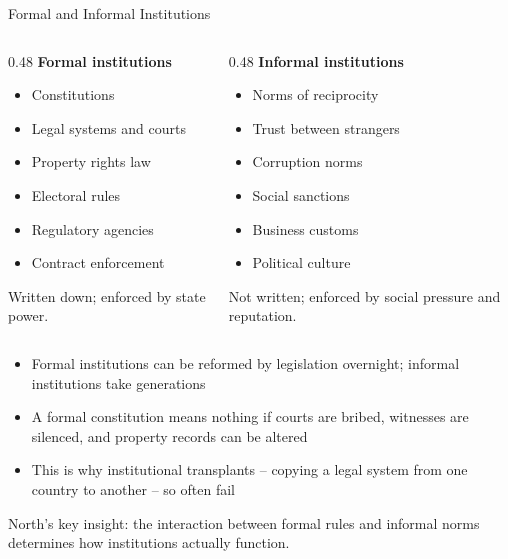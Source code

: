 \documentclass[10pt]{beamer}
\begin{document}
\begin{frame}[allowframebreaks]{Formal and Informal Institutions}

\begin{columns}[T]
\begin{column}{0.48\textwidth}
\textbf{\color{myTeal} Formal institutions}\\[6pt]
\begin{itemize}
\item Constitutions
\item Legal systems and courts
\item Property rights law
\item Electoral rules
\item Regulatory agencies
\item Contract enforcement
\end{itemize}
\vspace{4pt}
\footnotesize Written down; enforced by state power.
\end{column}
\begin{column}{0.48\textwidth}
\textbf{\color{myOrange} Informal institutions}\\[6pt]
\begin{itemize}
\item Norms of reciprocity
\item Trust between strangers
\item Corruption norms
\item Social sanctions
\item Business customs
\item Political culture
\end{itemize}
\vspace{4pt}
\footnotesize Not written; enforced by social pressure and reputation.
\end{column}
\end{columns}


\begin{itemize}
\item Formal institutions can be reformed by legislation overnight; informal institutions take generations
\item A formal constitution means nothing if courts are bribed, witnesses are silenced, and property records can be altered
\item This is why institutional transplants -- copying a legal system from one country to another -- so often fail
\end{itemize}


\alert{North's key insight: the interaction between formal rules and informal norms determines how institutions actually function.}
\end{frame}
\end{document}
